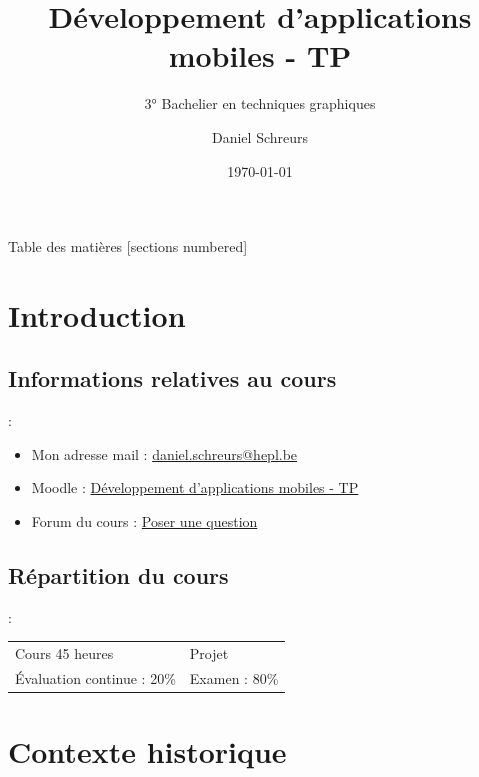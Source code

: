 \documentclass[10pt]{beamer}
\title{Développement d'applications mobiles - TP}
\subtitle{3° Bachelier en techniques graphiques}
\date{\today}
\author{Daniel Schreurs}
\institute{Haute École de Province de Liège}
\begin{document}
\maketitle

\begin{frame}[allowframebreaks]{Table des matières}
    [sections numbered]
    \tableofcontents
\end{frame}

\section{Introduction}

\subsection{Informations relatives au cours}
\begin{frame}{\secname : \subsecname}
    \begin{itemize}
        \item Mon adresse mail : \href{mailto:daniel.schreurs@hepl.be}{daniel.schreurs@hepl.be}
        \item Moodle : \href{https://moodle.ecolevirtuelle.be/course/view.php?id=21226}{Développement d'applications mobiles - TP}
        \item Forum du cours : \href{https://moodle.ecolevirtuelle.be/mod/forum/view.php?id=117587}{Poser une question}
    \end{itemize}
\end{frame}

\subsection{Répartition du cours}
\begin{frame}{\secname : \subsecname}
    \begin{table}[]
        \begin{tabular}{ll}
            Cours 45 heures            & Projet         \\
            Évaluation continue : 20\% & Examen  : 80\%
        \end{tabular}
    \end{table}
\end{frame}

\section{Contexte historique}
\end{document}
